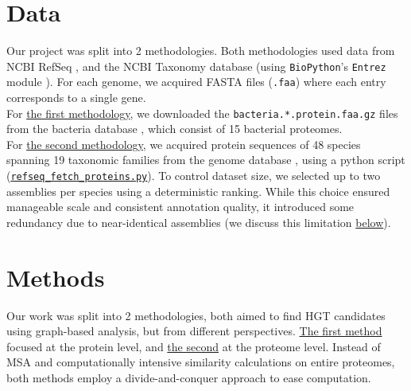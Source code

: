 \documentclass[11pt]{article}
\begin{document}
	\section{Data}
	\label{sec:data}
	Our project was split into 2 methodologies. Both methodologies used data from NCBI RefSeq \cite{RefSeq}, and the NCBI Taxonomy database \cite{NCBITaxonomy} (using \texttt{BioPython}'s \texttt{Entrez} module \cite{BioPythonEntrez}).
	For each genome, we acquired FASTA files (\texttt{.faa}) where each entry corresponds to a single gene.\\
	For \hyperref[subsec:method1]{the first methodology}, we downloaded the \texttt{bacteria.*.protein.faa.gz} files from the bacteria database \cite{RefSeqBacteria}, which consist of 15 bacterial proteomes.\\
	For \hyperref[subsec:method2]{the second methodology}, we acquired protein sequences of 48 species spanning 19 taxonomic families from the genome database \cite{RefSeqGenome}, using a python script (\href{https://github.com/noam-kimhi/Who-Stole-My-Genes/blob/main/Method\%202/src/graph_construction/refseq_fetch_proteins.py}{\uline{\texttt{refseq\_fetch\_proteins.py}}}). To control dataset size, we selected up to two assemblies per species using a deterministic
	ranking. While this choice ensured manageable scale and consistent annotation quality, it introduced some redundancy due to near-identical assemblies (we discuss this limitation \hyperref[subsubsec:evaluation]{below}).
	
	\section{Methods}
	Our work was split into 2 methodologies, both aimed to find HGT candidates using graph-based analysis, but from different perspectives. \hyperref[subsec:method1]{The first method} focused at the protein level, and \hyperref[subsec:method2]{the second} at the proteome level. Instead of MSA and computationally intensive similarity calculations on entire proteomes, both methods employ a divide-and-conquer approach to ease computation.
	
\end{document}
